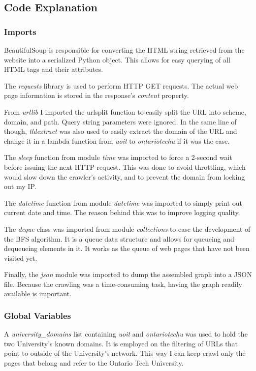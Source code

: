 \subsection{Code Explanation}
\subsubsection{Imports}
BeautifulSoup is responsible for converting the HTML string retrieved from the website into a serialized Python object. This allows for easy querying of all HTML tags and their attributes.

The \textit{requests} library is used to perform HTTP GET requests. The actual web page information is stored in the response's \textit{content} property.

From \textit{urllib} I imported the urlsplit function to easily split the URL into scheme, domain, and path. Query string parameters were ignored. In the same line of though, \textit{tldextract} was also used to easily extract the domain of the URL and change it in a lambda function from \textit{uoit} to \textit{ontariotechu} if it was the case.

The \textit{sleep} function from module \textit{time} was imported to force a 2-second wait before issuing the next HTTP request. This was done to avoid throttling, which would slow down the crawler's activity, and to prevent the domain from locking out my IP.

The \textit{datetime} function from module \textit{datetime} was imported to simply print out current date and time. The reason behind this was to improve logging quality.

The \textit{deque} class was imported from module \textit{collections} to ease the development of the BFS algorithm. It is a queue data structure and allows for queueing and dequeueing elements in it. It works as the queue of web pages that have not been visited yet.

Finally, the \textit{json} module was imported to dump the assembled graph into a JSON file. Because the crawling was a time-consuming task, having the graph readily available is important.

\subsubsection{Global Variables}
A \textit{university\_domains} list containing \textit{uoit} and \textit{ontariotechu} was used to hold the two University's known domains. It is employed on the filtering of URLs that point to outside of the University's network. This way I can keep crawl only the pages that belong and refer to the Ontario Tech University.

